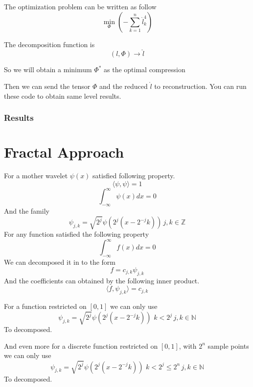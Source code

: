 \documentclass{article}
\theoremstyle{definition} %
\begin{document}
The optimization problem can be written as follow
\[
    \min_{\Phi}(-\sum_{k=1}^{n}\hat{l}_k^4)
\]

The decomposition function is
\[
    (l,\Phi)\to \hat{l}
\]

So we will obtain a minimum \(\Phi^*\) as the optimal
compression

Then we can send the tensor \(\Phi\) and the reduced
\(\mathring{l}\) to reconstruction.
You can run these code to obtain same level results.

\subsubsection{Results}




\section{Fractal Approach}
For a mother wavelet \(\psi(x)\) satisfied
following property.
\[
    \langle\psi,\psi\rangle=1
\]
\[
    \int_{-\infty}^{\infty}\psi(x)dx=0
\]
And the family
\[
    \psi_{j,k}=\sqrt{2^j}\psi(2^j(x-2^{-j}k)) \, j,k\in \mathbb{Z}
\]
For any function satisfied
the following property
\[
    \int_{-\infty}^{\infty}f(x)dx=0
\]
We can decomposed it in to the form
\[
    f=c_{j,k}\psi_{j,k}
\]
And the coefficients can obtained by
the following inner product.
\[
    \langle f,\psi_{j,k}\rangle=c_{j,k}
\]

For a function restricted on
\([0,1]\) we can only use
\[
    \psi_{j,k}=\sqrt{2^j}\psi(2^j(x-2^{-j}k)) \,
    \, k<2^j \, j,k\in \mathbb{N}
\]
To decomposed.

And even more for a discrete function restricted on
\([0,1]\), with \(2^n\) sample points we can only use
\[
    \psi_{j,k}=\sqrt{2^j}\psi(2^j(x-2^{-j}k)) \,
    \, k<2^j\leq2^n \, j,k\in \mathbb{N}
\]
To decomposed.
\end{document}
